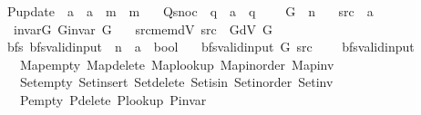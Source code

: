 \begin{isabellebody}
\ \ P{\isacharunderscore}{\kern0pt}update\ {\isacharcolon}{\kern0pt}{\isacharcolon}{\kern0pt}\ {\isachardoublequoteopen}{\isacharprime}{\kern0pt}a\ {\isasymRightarrow}\ {\isacharprime}{\kern0pt}a\ {\isasymRightarrow}\ {\isacharprime}{\kern0pt}m\ {\isasymRightarrow}\ {\isacharprime}{\kern0pt}m{\isachardoublequoteclose}\ \isanewline
\ \ Q{\isacharunderscore}{\kern0pt}snoc\ {\isacharcolon}{\kern0pt}{\isacharcolon}{\kern0pt}\ {\isachardoublequoteopen}{\isacharprime}{\kern0pt}q\ {\isasymRightarrow}\ {\isacharprime}{\kern0pt}a\ {\isasymRightarrow}\ {\isacharprime}{\kern0pt}q{\isachardoublequoteclose}\ {\isacharplus}{\kern0pt}\isanewline
\ \ \ G\ {\isacharcolon}{\kern0pt}{\isacharcolon}{\kern0pt}\ {\isacharprime}{\kern0pt}n\isanewline
\ \ \ src\ {\isacharcolon}{\kern0pt}{\isacharcolon}{\kern0pt}\ {\isacharprime}{\kern0pt}a\isanewline
\ \ \ invar{\isacharunderscore}{\kern0pt}G{\isacharcolon}{\kern0pt}\ {\isachardoublequoteopen}G{\isachardot}{\kern0pt}invar\ G{\isachardoublequoteclose}\isanewline
\ \ \ src{\isacharunderscore}{\kern0pt}mem{\isacharunderscore}{\kern0pt}dV{\isacharcolon}{\kern0pt}\ {\isachardoublequoteopen}src\ {\isasymin}\ G{\isachardot}{\kern0pt}dV\ G{\isachardoublequoteclose}\isanewline
\isanewline
{}\isamarkupfalse%
\ {\isacharparenleft}{\kern0pt}\ bfs{\isacharparenright}{\kern0pt}\ bfs{\isacharunderscore}{\kern0pt}valid{\isacharunderscore}{\kern0pt}input{\isacharprime}{\kern0pt}\ {\isacharcolon}{\kern0pt}{\isacharcolon}{\kern0pt}\ {\isachardoublequoteopen}{\isacharprime}{\kern0pt}n\ {\isasymRightarrow}\ {\isacharprime}{\kern0pt}a\ {\isasymRightarrow}\ bool{\isachardoublequoteclose}\ \isanewline
\ \ {\isachardoublequoteopen}bfs{\isacharunderscore}{\kern0pt}valid{\isacharunderscore}{\kern0pt}input{\isacharprime}{\kern0pt}\ G\ src\ {\isasymequiv}\isanewline
\ \ \ bfs{\isacharunderscore}{\kern0pt}valid{\isacharunderscore}{\kern0pt}input\isanewline
\ \ \ \ Map{\isacharunderscore}{\kern0pt}empty\ Map{\isacharunderscore}{\kern0pt}delete\ Map{\isacharunderscore}{\kern0pt}lookup\ Map{\isacharunderscore}{\kern0pt}inorder\ Map{\isacharunderscore}{\kern0pt}inv\isanewline
\ \ \ \ Set{\isacharunderscore}{\kern0pt}empty\ Set{\isacharunderscore}{\kern0pt}insert\ Set{\isacharunderscore}{\kern0pt}delete\ Set{\isacharunderscore}{\kern0pt}isin\ Set{\isacharunderscore}{\kern0pt}inorder\ Set{\isacharunderscore}{\kern0pt}inv\isanewline
\ \ \ \ P{\isacharunderscore}{\kern0pt}empty\ P{\isacharunderscore}{\kern0pt}delete\ P{\isacharunderscore}{\kern0pt}lookup\ P{\isacharunderscore}{\kern0pt}invar\isanewline

\end{isabellebody}

